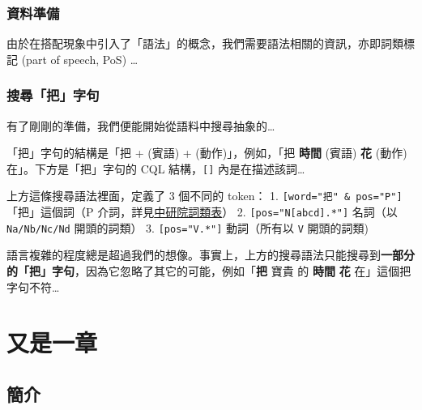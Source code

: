 \hypertarget{ux8cc7ux6599ux6e96ux5099}{%
\subsection{資料準備}\label{ux8cc7ux6599ux6e96ux5099}}

由於在搭配現象中引入了「語法」的概念，我們需要語法相關的資訊，亦即詞類標記
(part of speech, PoS) \ldots{}

\begin{Shaded}
\begin{Highlighting}[]
\end{Highlighting}
\end{Shaded}

\hypertarget{ux641cux5c0bux628aux5b57ux53e5}{%
\subsection{搜尋「把」字句}\label{ux641cux5c0bux628aux5b57ux53e5}}

有了剛剛的準備，我們便能開始從語料中搜尋抽象的\ldots{}

「把」字句的結構是「把 + (賓語) + (動作)」，例如，「把 \textbf{時間}
(賓語) \textbf{花} (動作) 在」。下方是「把」字句的 CQL
結構，\texttt{{[}{]}} 內是在描述該詞\ldots{}

上方這條搜尋語法裡面，定義了 3 個不同的 token： 1.
\texttt{{[}word="把"\ \&\ pos="P"{]}} 「把」這個詞（P
介詞，詳見\href{https://github.com/ckiplab/ckiptagger/wiki/POS-Tags}{中研院詞類表}）
2. \texttt{{[}pos="N{[}abcd{]}.*"{]}} 名詞（以 \texttt{Na/Nb/Nc/Nd}
開頭的詞類） 3. \texttt{{[}pos="V.*"{]}} 動詞（所有以 \texttt{V}
開頭的詞類)

語言複雜的程度總是超過我們的想像。事實上，上方的搜尋語法只能搜尋到\textbf{一部分的「把」字句}，因為它忽略了其它的可能，例如「\textbf{把}
寶貴 的 \textbf{時間} \textbf{花} 在」這個把字句不符\ldots{}

\hypertarget{ux53c8ux662fux4e00ux7ae0}{%
\chapter{又是一章}\label{ux53c8ux662fux4e00ux7ae0}}

\hypertarget{ux7c21ux4ecb}{%
\section{簡介}\label{ux7c21ux4ecb}}

